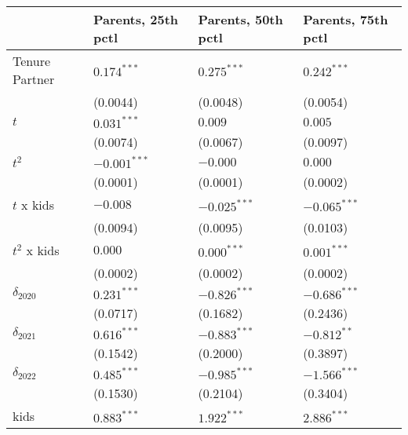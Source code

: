 \begin{tabular}{llll}
\toprule
{} & Parents, 25th pctl & Parents, 50th pctl & Parents, 75th pctl \\
\midrule
Tenure Partner                          &      $0.174^{***}$ &      $0.275^{***}$ &      $0.242^{***}$ \\
                                        &           (0.0044) &           (0.0048) &           (0.0054) \\
$t$                                     &      $0.031^{***}$ &            $0.009$ &            $0.005$ \\
                                        &           (0.0074) &           (0.0067) &           (0.0097) \\
$t^2$                                   &     $-0.001^{***}$ &           $-0.000$ &            $0.000$ \\
                                        &           (0.0001) &           (0.0001) &           (0.0002) \\
$t$ x kids                              &           $-0.008$ &     $-0.025^{***}$ &     $-0.065^{***}$ \\
                                        &           (0.0094) &           (0.0095) &           (0.0103) \\
$t^2$ x kids                            &            $0.000$ &      $0.000^{***}$ &      $0.001^{***}$ \\
                                        &           (0.0002) &           (0.0002) &           (0.0002) \\
$\delta_{2020}$                         &      $0.231^{***}$ &     $-0.826^{***}$ &     $-0.686^{***}$ \\
                                        &           (0.0717) &           (0.1682) &           (0.2436) \\
$\delta_{2021}$                         &      $0.616^{***}$ &     $-0.883^{***}$ &      $-0.812^{**}$ \\
                                        &           (0.1542) &           (0.2000) &           (0.3897) \\
$\delta_{2022}$                         &      $0.485^{***}$ &     $-0.985^{***}$ &     $-1.566^{***}$ \\
                                        &           (0.1530) &           (0.2104) &           (0.3404) \\
kids                                    &      $0.883^{***}$ &      $1.922^{***}$ &      $2.886^{***}$ \\

\end{tabular}
